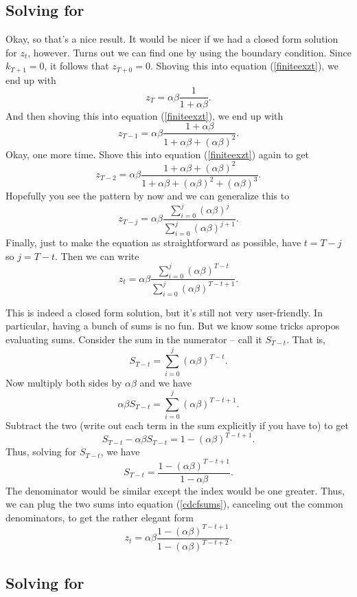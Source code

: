 \documentclass[12pt]{article}
\theoremstyle{definition}
\begin{document}
\subsection{Solving for }

Okay, so that's a nice result. It would be nicer if we had a closed form solution for $z_t$, however. Turns out we can find one by using the boundary condition. Since $k_{T+1}=0$, it follows that $z_{T+0} = 0$. Shoving this into equation (\ref{finiteexzt}), we end up with
	\[	z_T = \alpha \beta\frac{1}{1 + \alpha \beta}.\]
And then shoving this into  equation (\ref{finiteexzt}), we end up with
	\[ z_{T - 1} = \alpha \beta \frac{ 1 + \alpha \beta}{1 + \alpha \beta + (\alpha\beta)^2} .\]
Okay, one more time. Shove this into  equation (\ref{finiteexzt}) again to get
	\[z_{T-2} = \alpha \beta \frac{1 + \alpha \beta + (\alpha \beta)^2}{1 + \alpha \beta + (\alpha\beta)^2 + (\alpha\beta)^3}.	\]
Hopefully you see the pattern by now and we can generalize this to
	\[z_{T-j} = \alpha \beta \frac{ \sum_{i=0}^j (\alpha \beta)^j}{ \sum_{i=0}^j (\alpha \beta)^{j+1}}. \]
Finally, just to make the equation as straightforward as possible, have $t=T-j$ so $j = T-t$. Then we can write
	\[ z_t =  \alpha \beta \frac{ \sum_{i=0}^j (\alpha \beta)^{T-t}}{ \sum_{i=0}^j (\alpha \beta)^{T-t+1}}.	\label{cdcfsums}\]

This is indeed a closed form solution, but it's still not very user-friendly. In particular, having a bunch of sums is no fun. But we know some tricks apropos evaluating sums. Consider the sum in the numerator -- call it $S_{T-t}$. That is,
	\[S_{T-t} =  \sum_{i=0}^j (\alpha \beta)^{T-t} .\]
Now multiply both sides by $\alpha \beta$ and we have
	\[\alpha \beta S_{T-t} =  \sum_{i=0}^j (\alpha \beta)^{T-t+1} .\]
Subtract the two (write out each term in the sum explicitly if you have to) to get
	\[ S_{T-t} - \alpha \beta S_{T-t} = 1 - (\alpha \beta)^{T -t +1}.\]
Thus, solving for $S_{T-t}$, we have
	\[	S_{T-t}	= \frac{ 1 - (\alpha \beta)^{T -t +1}}{1 - \alpha \beta}. \]
The denominator would be similar except the index would be one greater. Thus, we can plug the two sums into equation (\ref{cdcfsums}), canceling out the common denominators, to get the rather elegant form
\begin{equation}
	z_t = \alpha \beta \frac{ 1 - (\alpha \beta)^{T -t +1}}{ 1 - (\alpha \beta)^{T -t +2}}.	 \label{cdztsol}
\end{equation}


\subsection{Solving for }
\end{document}
